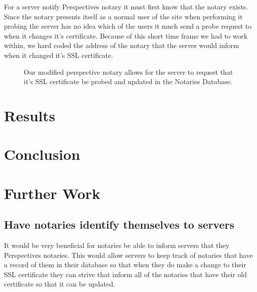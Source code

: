 \documentclass[preprint,review,12pt]{elsarticle}
\begin{document}
For a server notify Perspectives notary it must first know that the notary
exists. Since the notary presents itself as a normal user of the site when
performing it probing the server has no idea which of the users it much send a
probe request to when it changes it's certificate. Because of this short time
frame we had to work within, we hard coded the address of the notary that the
server would inform when it changed it's SSL certificate.

\begin{figure}[h]
\caption{Our modified perspective notary allows for the server to request that
    it's SSL certificate be probed and updated in the Notaries Database.}
\end{figure}

\section{Results}
\label{results}

\section{Conclusion}
\label{conclusion}

\section{Further Work}
\label{further work}

\subsection{Have notaries identify themselves to servers}

It would be very beneficial for notaries be able to inform servers that they
Perspectives notaries. This would allow servers to keep track of notaries
that have a record of them in their database so that when they do make a
change to their SSL certificate they can strive that inform all of the
notaries that have their old certificate so that it can be updated.
\end{document}
